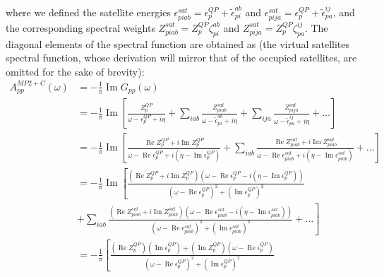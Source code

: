 where we defined the satellite energies $\epsilon_{piab}^{sat} = \epsilon_p^{QP} + \tilde\epsilon_{pi}^{ab}$ and $\epsilon_{pija}^{sat} = \epsilon_p^{QP} + \tilde\epsilon_{pa}^{ij}$, and the corresponding spectral weights $Z_{piab}^{sat} = Z_p^{QP} \zeta_{pi}^{ab}$ and $Z_{pija}^{sat} = Z_p^{QP} \zeta_{pa}^{ij}$.
The diagonal elements of the spectral function are obtained as (the virtual satellites spectral function, whose derivation will mirror that of the occupied satellites, are omitted for the sake of brevity):
\begin{align}
A_{pp}^{MP2+C}(\omega) & = -\frac{1}{\pi} \operatorname{Im} G_{pp}(\omega) \\
& = -\frac{1}{\pi} \operatorname{Im}\left[\frac{Z_p^{QP}}{\omega - \epsilon_p^{QP} + i\eta} + \sum_{i a b} \frac{Z_{piab}^{sat}}{\omega - \tilde\epsilon_{pi}^{ab} + i\eta} + \sum_{i j a} \frac{Z_{pija}^{sat}}{\omega - \tilde\epsilon_{pa}^{ij} + i\eta} + \ldots \right] \\
&= -\frac{1}{\pi} \operatorname{Im}\left[\frac{\operatorname{Re} Z_p^{QP} + i \operatorname{Im} Z_p^{QP}}{\omega - \operatorname{Re} \epsilon_p^{QP} + i\left(\eta - \operatorname{Im} \epsilon_p^{QP}\right)} + \sum_{i a b} \frac{\operatorname{Re} Z_{piab}^{sat} + i \operatorname{Im} Z_{piab}^{sat}}{\omega - \operatorname{Re} \epsilon_{piab}^{sat} + i\left(\eta - \operatorname{Im} \epsilon_{piab}^{sat}\right)} + \ldots \right] \\
&= -\frac{1}{\pi} \operatorname{Im}\left[\frac{\left(\operatorname{Re} Z_p^{QP} + i \operatorname{Im} Z_p^{QP}\right)\left(\omega - \operatorname{Re} \epsilon_p^{QP} - i\left(\eta - \operatorname{Im} \epsilon_p^{QP}\right)\right)}{\left(\omega - \operatorname{Re} \epsilon_p^{QP}\right)^2 + \left(\operatorname{Im} \epsilon_p^{QP}\right)^2}\right.\\
& \left. + \sum_{i a b} \frac{\left(\operatorname{Re} Z_{piab}^{sat} + i \operatorname{Im} Z_{piab}^{sat}\right)\left(\omega - \operatorname{Re} \epsilon_{piab}^{sat} - i\left(\eta - \operatorname{Im} \epsilon_{piab}^{sat}\right)\right)}{\left(\omega - \operatorname{Re} \epsilon_{piab}^{sat}\right)^2 + \left(\operatorname{Im} \epsilon_{piab}^{sat}\right)^2} + \ldots \right] \\
&= -\frac{1}{\pi}\left[\frac{\left(\operatorname{Re} Z_p^{QP}\right)\left(\operatorname{Im} \epsilon_p^{QP}\right) + \left(\operatorname{Im} Z_p^{QP}\right)\left(\omega - \operatorname{Re} \epsilon_p^{QP}\right)}{\left(\omega - \operatorname{Re} \epsilon_p^{QP}\right)^2 + \left(\operatorname{Im} \epsilon_p^{QP}\right)^2}\right.\\

\end{align}
